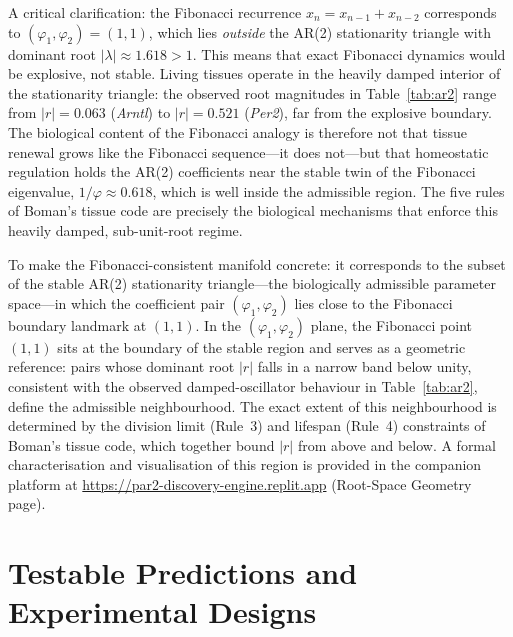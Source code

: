 \documentclass[]{interact}
\newcommand{\bburl}[1]{\textcolor{blue}{\url{#1}}}
\begin{document}
A critical clarification: the Fibonacci recurrence $x_n = x_{n-1}+x_{n-2}$
corresponds to $(\varphi_1,\varphi_2)=(1,1)$, which lies \emph{outside} the
AR(2) stationarity triangle with dominant root $|\lambda|\approx 1.618>1$.
This means that exact Fibonacci dynamics would be explosive, not stable.
Living tissues operate in the heavily damped interior of the stationarity
triangle: the observed root magnitudes in Table~\ref{tab:ar2} range from
$|r|=0.063$ (\textit{Arntl}) to $|r|=0.521$ (\textit{Per2}), far from the
explosive boundary.
The biological content of the Fibonacci analogy is therefore not that tissue
renewal grows like the Fibonacci sequence---it does not---but that homeostatic
regulation holds the AR(2) coefficients near the stable twin of the Fibonacci
eigenvalue, $1/\varphi\approx 0.618$, which is well inside the admissible
region.
The five rules of Boman's tissue code are precisely the biological mechanisms
that enforce this heavily damped, sub-unit-root regime.

To make the Fibonacci-consistent manifold concrete: it corresponds to the
subset of the stable AR(2) stationarity triangle---the biologically admissible
parameter space---in which the coefficient pair $(\varphi_1, \varphi_2)$ lies
close to the Fibonacci boundary landmark at $(1,1)$.
In the $(\varphi_1, \varphi_2)$ plane, the Fibonacci point $(1,1)$ sits at the
boundary of the stable region and serves as a geometric reference: pairs whose
dominant root $|r|$ falls in a narrow band below unity, consistent with the
observed damped-oscillator behaviour in Table~\ref{tab:ar2}, define the
admissible neighbourhood.
The exact extent of this neighbourhood is determined by the division limit
(Rule~3) and lifespan (Rule~4) constraints of Boman's tissue code, which
together bound $|r|$ from above and below.
A formal characterisation and visualisation of this region is provided in the
companion platform at \bburl{https://par2-discovery-engine.replit.app}
(Root-Space Geometry page).

\section{Testable Predictions and Experimental Designs}
\end{document}
